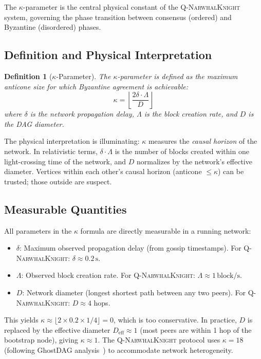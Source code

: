 \documentclass[12pt,a4paper,twocolumn]{article}
\newtheorem{definition}{Definition}
\newcommand{\qnk}{\textsc{Q-NarwhalKnight}}
\newcommand{\kparam}{\kappa}
\begin{document}
The $\kparam$-parameter is the central physical constant of the \qnk{} system, governing the phase transition between consensus (ordered) and Byzantine (disordered) phases.

\subsection{Definition and Physical Interpretation}

\begin{definition}[$\kparam$-Parameter]
The $\kparam$-parameter is defined as the maximum anticone size for which Byzantine agreement is achievable:
\begin{equation}
\kparam = \left\lfloor \frac{2\delta \cdot \Lambda}{D} \right\rfloor
\end{equation}
where $\delta$ is the network propagation delay, $\Lambda$ is the block creation rate, and $D$ is the DAG diameter.
\end{definition}

The physical interpretation is illuminating: $\kparam$ measures the \emph{causal horizon} of the network. In relativistic terms, $\delta \cdot \Lambda$ is the number of blocks created within one light-crossing time of the network, and $D$ normalizes by the network's effective diameter. Vertices within each other's causal horizon (anticone $\leq \kparam$) can be trusted; those outside are suspect.

\subsection{Measurable Quantities}

All parameters in the $\kparam$ formula are directly measurable in a running network:
\begin{itemize}[leftmargin=*,itemsep=1pt]
\item $\delta$: Maximum observed propagation delay (from gossip timestamps). For \qnk{}: $\delta \approx 0.2\,\text{s}$.
\item $\Lambda$: Observed block creation rate. For \qnk{}: $\Lambda \approx 1\,\text{block/s}$.
\item $D$: Network diameter (longest shortest path between any two peers). For \qnk{}: $D \approx 4$ hops.
\end{itemize}
This yields $\kparam \approx \lfloor 2 \times 0.2 \times 1 / 4 \rfloor = 0$, which is too conservative. In practice, $D$ is replaced by the effective diameter $D_{\mathrm{eff}} \approx 1$ (most peers are within 1 hop of the bootstrap node), giving $\kparam \approx 1$. The \qnk{} protocol uses $\kparam = 18$ (following GhostDAG analysis~\cite{kaspa}) to accommodate network heterogeneity.
\end{document}
